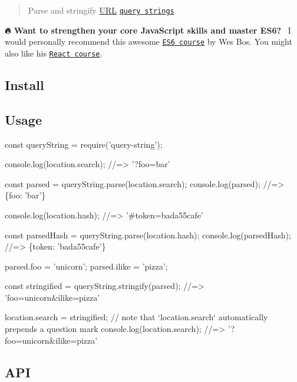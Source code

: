 \begin{quote}
Parse and stringify \mbox{\hyperlink{namespace_u_r_l}{U\+RL}} \href{http://en.wikipedia.org/wiki/Query_string}{\tt query strings} \end{quote}




{\bfseries 🔥 Want to strengthen your core Java\+Script skills and master E\+S6?}~\newline
I would personally recommend this awesome \href{https://ES6.io/friend/AWESOME}{\tt E\+S6 course} by Wes Bos. You might also like his \href{https://ReactForBeginners.com/friend/AWESOME}{\tt React course}.





\subsection*{Install}




\subsection*{Usage}


\begin{DoxyCode}
const queryString = require('query-string');

console.log(location.search);
//=> '?foo=bar'

const parsed = queryString.parse(location.search);
console.log(parsed);
//=> \{foo: 'bar'\}

console.log(location.hash);
//=> '#token=bada55cafe'

const parsedHash = queryString.parse(location.hash);
console.log(parsedHash);
//=> \{token: 'bada55cafe'\}

parsed.foo = 'unicorn';
parsed.ilike = 'pizza';

const stringified = queryString.stringify(parsed);
//=> 'foo=unicorn&ilike=pizza'

location.search = stringified;
// note that `location.search` automatically prepends a question mark
console.log(location.search);
//=> '?foo=unicorn&ilike=pizza'
\end{DoxyCode}


\subsection*{A\+PI}

